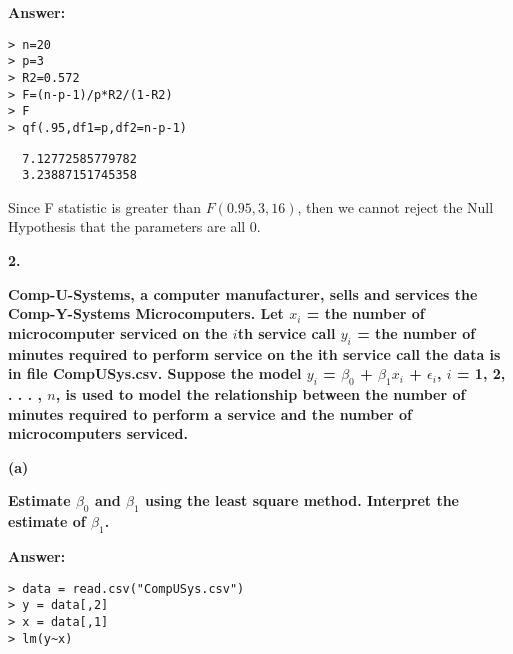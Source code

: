 \documentclass[letterpaper,11pt]{article}
\begin{document}
\begin{addmargin}[-0.5em]{0em}
\textbf{Answer: }\end{addmargin}

\begin{lstlisting}
> n=20
> p=3
> R2=0.572
> F=(n-p-1)/p*R2/(1-R2)
> F
> qf(.95,df1=p,df2=n-p-1)
\end{lstlisting}

\begin{lstlisting}
  7.12772585779782
  3.23887151745358
\end{lstlisting}
Since F statistic is greater than $F(0.95,3,16)$, then we cannot reject the Null Hypothesis that the parameters are all 0.


\begin{addmargin}[-2em]{0em} \large{\textbf{2. }}\end{addmargin}

\begin{addmargin}[-1.1em]{0em} \textbf{Comp-U-Systems, a computer manufacturer, sells and services the Comp-Y-Systems Microcomputers. Let
$x_i$ = the number of microcomputer serviced on the $i$th service call
$y_i$ = the number of minutes required to perform service on the ith service call
the data is in file CompUSys.csv. Suppose the model $y_i$ = $\beta_0$ + $\beta_1x_i$ + $\epsilon_i$, $i$ = 1, 2, . . . , $n$, is used to model the relationship between the number of minutes required to perform a service and the number of microcomputers serviced.
}\par\end{addmargin}

\bigbreak
\begin{addmargin}[-1.1em]{0em}
\textbf{(a)}\par\end{addmargin}
\textbf{Estimate $\beta_0$ and $\beta_1$ using the least square method. Interpret the estimate of $\beta_1$.}\par
\bigbreak
\begin{addmargin}[-0.5em]{0em}
\textbf{Answer: }\end{addmargin}

\begin{lstlisting}
> data = read.csv("CompUSys.csv")
> y = data[,2]
> x = data[,1]
> lm(y~x)
\end{lstlisting}
\end{document}
